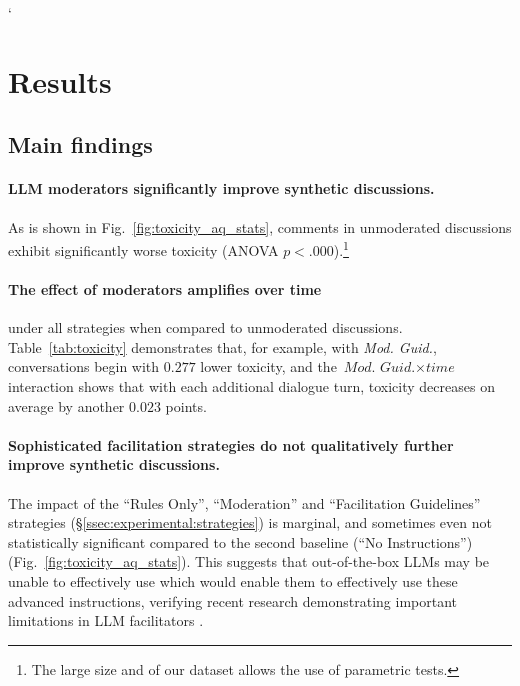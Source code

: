 `%
%

\section{Results}
\label{sec:results}


\subsection{Main findings}

\paragraph{\ac{LLM} moderators significantly improve synthetic discussions.} As is shown in Fig.~\ref{fig:toxicity_aq_stats}, comments in unmoderated discussions exhibit significantly worse toxicity (ANOVA $p<.000$).\footnote{The large size and of our dataset allows the use of parametric tests.} 

\paragraph{The effect of moderators amplifies over time} under all strategies when compared to unmoderated discussions. Table~\ref{tab:toxicity} demonstrates that, for example, with \textit{Mod. Guid.}, conversations begin with $0.277$ lower toxicity, and the $\textit{Mod. Guid.} \times \textit{time}$ interaction shows that with each additional dialogue turn, toxicity decreases on average by another $0.023$ points.

\paragraph{Sophisticated facilitation strategies do not qualitatively further improve synthetic discussions.} The impact of the ``Rules Only'', ``Moderation'' and ``Facilitation Guidelines''  strategies (\S\ref{ssec:experimental:strategies}) is marginal, and sometimes even not statistically significant compared to the second baseline (``No Instructions'') (Fig.~\ref{fig:toxicity_aq_stats}). This suggests that out-of-the-box \acp{LLM} may be unable to effectively use which would enable them to effectively use these advanced instructions, verifying recent research demonstrating important limitations in \ac{LLM} facilitators \cite{cho-etal-2024-language}. %

